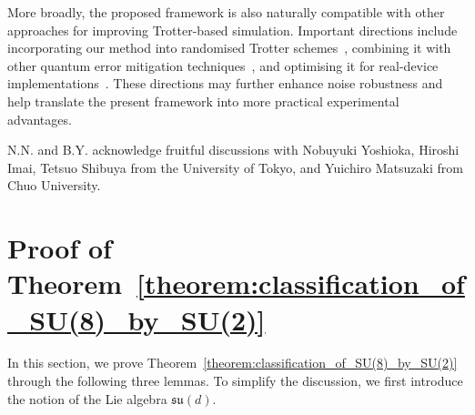 \documentclass[aps,showpacs,amsmath,amssymb,twocolumn,prx,longbibliography,superscriptaddress,notitlepage,floatfix,10pt]{revtex4-2}
\begin{document}
More broadly, the proposed framework is also naturally compatible with other approaches for improving Trotter-based simulation.
Important directions include incorporating our method into randomised Trotter schemes~\cite{Campbell2019Random, Kiumi2025TE-PAI}, combining it with other quantum error mitigation techniques~\cite{Temme2017Error, Endo2019Mitigating, Hakkaku2025Data-Efficient, yang2022efficient, Yoshioka2022Generalized, Yang2025Resource-Efficient, cai2023quantum}, and optimising it for real-device implementations~\cite{Kim2023Evidence, Yoshioka2025Krylov}.
These directions may further enhance noise robustness and help translate the present framework into more practical experimental advantages.




\begin{acknowledgments}
    N.N. and B.Y. acknowledge fruitful discussions with Nobuyuki Yoshioka, Hiroshi Imai, Tetsuo Shibuya from the University of Tokyo, and Yuichiro Matsuzaki from Chuo University.
\end{acknowledgments}




\appendix



\section{Proof of Theorem~\ref{theorem:classification_of_SU(8)_by_SU(2)}\label{appendix:Theorem_genflame}}

In this section, we prove Theorem~\ref{theorem:classification_of_SU(8)_by_SU(2)} through the following three lemmas. 
To simplify the discussion, we first introduce the notion of the Lie algebra $\mathfrak{su}(d)$.
\end{document}
